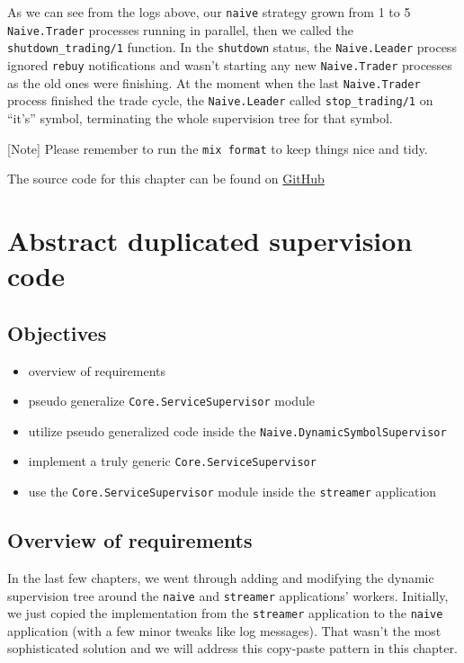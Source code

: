 \documentclass[
  oneside]{book}
\providecommand{\tightlist}{%
  \setlength{\itemsep}{0pt}\setlength{\parskip}{0pt}}
\begin{document}
As we can see from the logs above, our \texttt{naive} strategy grown from 1 to 5 \texttt{Naive.Trader} processes running in parallel, then we called the \texttt{shutdown\_trading/1} function. In the \texttt{shutdown} status, the \texttt{Naive.Leader} process ignored \texttt{rebuy} notifications and wasn't starting any new \texttt{Naive.Trader} processes as the old ones were finishing. At the moment when the last \texttt{Naive.Trader} process finished the trade cycle, the \texttt{Naive.Leader} called \texttt{stop\_trading/1} on ``it's'' symbol, terminating the whole supervision tree for that symbol.

{[}Note{]} Please remember to run the \texttt{mix\ format} to keep things nice and tidy.

The source code for this chapter can be found on \href{https://github.com/Cinderella-Man/hands-on-elixir-and-otp-cryptocurrency-trading-bot-source-code/tree/chapter_12}{GitHub}

\chapter{Abstract duplicated supervision code}\label{abstract-duplicated-supervision-code}

\section{Objectives}\label{objectives-12}

\begin{itemize}
\tightlist
\item
  overview of requirements
\item
  pseudo generalize \texttt{Core.ServiceSupervisor} module
\item
  utilize pseudo generalized code inside the \texttt{Naive.DynamicSymbolSupervisor}
\item
  implement a truly generic \texttt{Core.ServiceSupervisor}
\item
  use the \texttt{Core.ServiceSupervisor} module inside the \texttt{streamer} application
\end{itemize}

\section{Overview of requirements}\label{overview-of-requirements}

In the last few chapters, we went through adding and modifying the dynamic supervision tree around the \texttt{naive} and \texttt{streamer} applications' workers. Initially, we just copied the implementation from the \texttt{streamer} application to the \texttt{naive} application (with a few minor tweaks like log messages). That wasn't the most sophisticated solution and we will address this copy-paste pattern in this chapter.
\end{document}
